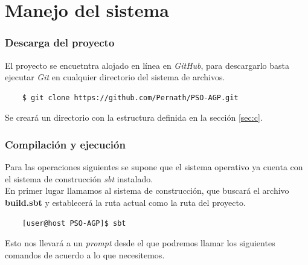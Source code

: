 \documentclass[12pt]{article}
\begin{document}

\section{Manejo del sistema} %
\subsubsection*{Descarga del proyecto}
El proyecto se encuetntra alojado en línea en \textit{GitHub}, para
descargarlo basta ejecutar \textit{Git} en cualquier directorio del
sistema de archivos.
\begin{verbatim}
    $ git clone https://github.com/Pernath/PSO-AGP.git
\end{verbatim}
Se creará un directorio con la estructura definida en la sección \ref{sec:c}.
\subsubsection*{Compilación y ejecución}
Para las operaciones siguientes se supone que el sistema operativo ya cuenta con el sistema de construcción \textit{sbt} instalado.\\

\noindent
En primer lugar llamamos al sistema de construcción, que buscará el
archivo \textbf{build.sbt} y establecerá la ruta actual como la ruta
del proyecto.
\begin{verbatim}
    [user@host PSO-AGP]$ sbt
\end{verbatim}
Esto nos llevará a un \textit{prompt} desde el que podremos llamar
los siguientes comandos de acuerdo a lo que necesitemos.
\end{document}
